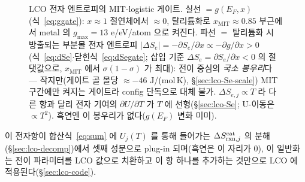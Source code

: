 \begin{figure}[t]
\begin{tikzpicture}[x=7.2cm,y=1.0cm]
\end{tikzpicture}
\caption{LCO 전자 엔트로피의 MIT-logistic 게이트. 실선 $=g(E_F,x)$(식~\eqref{eq:ggate}): $x\!\approx\!1$
절연체에서 $\approx0$, 탈리튬화로 $x_\mathrm{MIT}\!\approx\!0.85$ 부근에서 metal 의 $g_{\max}\!=\!13$ e/eV/atom 으로 켜진다.
파선 $=$ 탈리튬화 시 방출되는 부분몰 전자 엔트로피 $|\Delta S_e|=-\partial S_e/\partial x\propto-\partial g/\partial x>0$
(식~\eqref{eq:dSe}$\cdot$닫힌식~\eqref{eq:dSegate}; 삽입 기준 $\Delta S_e=\partial S_e/\partial x<0$ 의 절댓값으로,
$x_\mathrm{MIT}$ 에서 $\sigma(1-\sigma)$ 가 최대): 전이 중심의 \emph{국소
봉우리}다 --- 작지만(게이트 골 몰당 $\approx-46$ J/(mol\,K), \S\ref{sec:lco-Se-scale}) MIT 구간에만 켜지는 게이트라 config 단독으로 대체 불가.
$\Delta S_{e,j}\propto T$ 라 다른 항과 달리 전자 기여의 $\partial U/\partial T$ 가 $T$ 에 선형(\S\ref{sec:lco-Se}; U-이동은
$\propto T^2$). 흑연엔 이 봉우리가 없다($g(E_F)$ 변화 미미).}
\label{fig:lco-electronic}
\end{figure}

이 전자항이 합산식~\eqref{eq:sum} 에 $U_j(T)$ 를 통해 들어가는 $\Delta S_{\mathrm{rxn},j}^\mathrm{cat}$ 의 분해
(\S\ref{sec:lco-decomp})에서 셋째 성분으로 plug-in 되며(흑연은 이 자리가 0),
이 일반화는 전이 파라미터를 LCO 값으로 치환하고 이 항 하나를 추가하는 것만으로 LCO 에 적용된다(\S\ref{sec:lco-code}).

